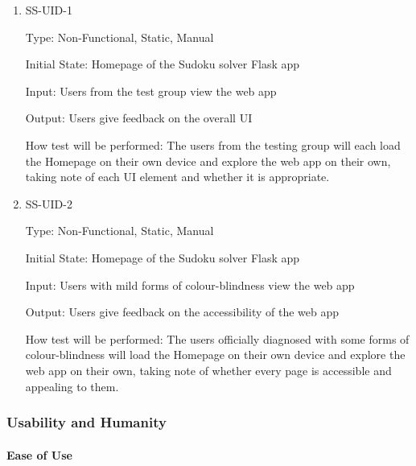 \documentclass[11pt]{article}
\begin{document}
\begin{enumerate}

\item{SS-UID-1\\}

Type: Non-Functional, Static, Manual
					
Initial State: Homepage of the Sudoku solver Flask app
					
Input: Users from the test group view the web app
					
Output: Users give feedback on the overall UI
					
How test will be performed: The users from the testing group will each load the Homepage on their own device and explore the web app on their own, taking note of each UI element and whether it is appropriate.
					
\item{SS-UID-2\\}

Type: Non-Functional, Static, Manual
					
Initial State: Homepage of the Sudoku solver Flask app
					
Input: Users with mild forms of colour-blindness view the web app
					
Output: Users give feedback on the accessibility of the web app
					
How test will be performed: The users officially diagnosed with some forms of colour-blindness will load the Homepage on their own device and explore the web app on their own, taking note of whether every page is accessible and appealing to them.

\end{enumerate}

\subsubsection{Usability and Humanity}

\paragraph{Ease of Use}
\end{document}
